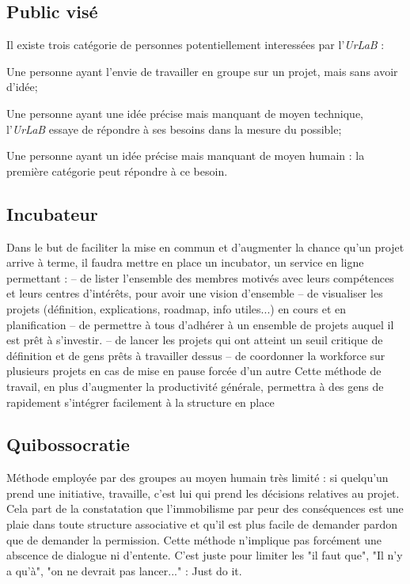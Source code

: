 \documentclass[a4paper]{article}
\begin{document}
        \subsection*{Public visé}
\begin{list}{-}{} Il existe trois catégorie de personnes potentiellement interessées par l'\emph{UrLaB} :
\item Une personne ayant l'envie de travailler en groupe sur un projet, mais sans avoir d'idée;
\item Une personne ayant une idée précise mais manquant de moyen technique, l'\emph{UrLaB} essaye de répondre à ses besoins dans la mesure du possible;
\item Une personne ayant un idée précise mais manquant de moyen humain : la première catégorie peut répondre à ce besoin.
\end{list}

        \subsection*{Incubateur} %
Dans  le but de faciliter la mise en commun et d’augmenter la chance qu’un  projet arrive à terme, il faudra mettre en place un incubator, un  service en ligne permettant :
–  de lister l’ensemble des membres motivés avec leurs compétences et  leurs centres d’intérêts, pour avoir une vision d’ensemble
– de visualiser les projets (définition, explications, roadmap, info utiles...) en cours et en planification
– de permettre à tous d’adhérer à un ensemble de projets auquel il est prêt à s’investir.
– de lancer les projets qui ont atteint un seuil critique de définition et de gens prêts à travailler dessus
– de coordonner la workforce sur plusieurs projets en cas de mise en pause forcée d’un autre
Cette  méthode de travail, en plus d’augmenter la productivité générale,  permettra à des gens de rapidement s’intégrer facilement à la  structure en place


        \subsection*{Quibossocratie} %
Méthode  employée par des groupes au moyen humain très limité : si quelqu’un  prend une initiative, travaille, c’est lui qui prend les décisions  relatives au projet. Cela part de la constatation que l’immobilisme par  peur des conséquences est une plaie dans toute structure associative et  qu’il est plus facile de demander pardon que de demander la permission.
Cette  méthode n’implique pas forcément une abscence de dialogue ni  d’entente. C’est juste pour limiter les "il faut que", "Il n’y a qu’à",  "on ne devrait pas lancer..." : Just do it.
\end{document}
